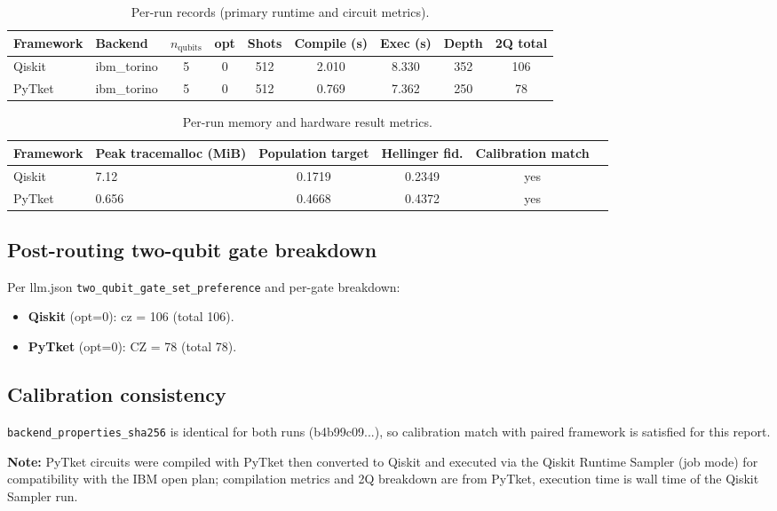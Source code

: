 \documentclass[11pt,a4paper]{article}
\begin{document}
\begin{table}[h]
\centering
\caption{Per-run records (primary runtime and circuit metrics).}
\label{tab:per-run}
\begin{tabular}{llccccccc}
\toprule
Framework & Backend & \(n_{\mathrm{qubits}}\) & opt & Shots & Compile (s) & Exec (s) & Depth & 2Q total \\
\midrule
Qiskit    & ibm\_torino & 5 & 0 & 512 & 2.010 & 8.330 & 352 & 106 \\
PyTket    & ibm\_torino & 5 & 0 & 512 & 0.769 & 7.362 & 250 & 78  \\
\bottomrule
\end{tabular}
\end{table}

\begin{table}[h]
\centering
\caption{Per-run memory and hardware result metrics.}
\label{tab:per-run-metrics}
\begin{tabular}{llcccc}
\toprule
Framework & Peak tracemalloc (MiB) & Population target & Hellinger fid. & Calibration match \\
\midrule
Qiskit & 7.12 & 0.1719 & 0.2349 & yes \\
PyTket & 0.656 & 0.4668 & 0.4372 & yes \\
\bottomrule
\end{tabular}
\end{table}

\subsection{Post-routing two-qubit gate breakdown}
Per llm.json \texttt{two\_qubit\_gate\_set\_preference} and per-gate breakdown:
\begin{itemize}
  \item \textbf{Qiskit} (opt=0): cz = 106 (total 106).
  \item \textbf{PyTket} (opt=0): CZ = 78 (total 78).
\end{itemize}

\subsection{Calibration consistency}
\texttt{backend\_properties\_sha256} is identical for both runs (b4b99c09...), so calibration match with paired framework is satisfied for this report.

\textbf{Note:} PyTket circuits were compiled with PyTket then converted to Qiskit and executed via the Qiskit Runtime Sampler (job mode) for compatibility with the IBM open plan; compilation metrics and 2Q breakdown are from PyTket, execution time is wall time of the Qiskit Sampler run.
\end{document}

